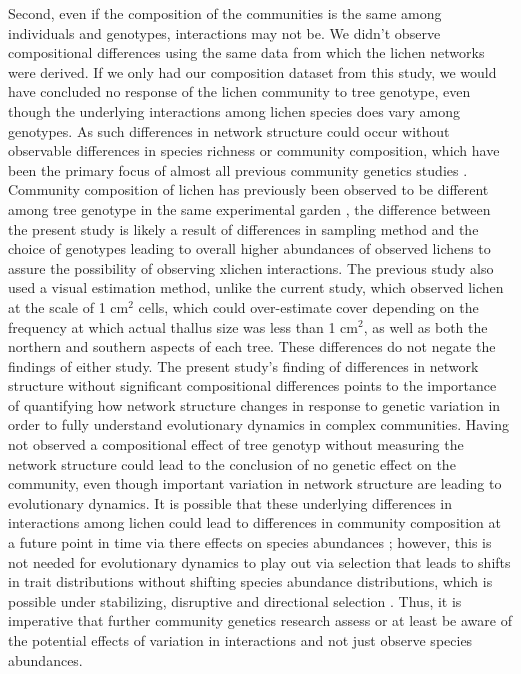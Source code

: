 \documentclass[11pt,twocolumn,twoside,lineno]{pnas-new}
\begin{document}
Second, even if the composition of the communities is the same among
individuals and genotypes, interactions may not be. We didn't observe
compositional differences using the same data from which the lichen
networks were derived. If we only had our composition dataset from
this study, we would have concluded no response of the lichen
community to tree genotype, even though the underlying interactions
among lichen species does vary among genotypes. As such differences in
network structure could occur without observable differences in
species richness or community composition, which have been the primary
focus of almost all previous community genetics studies
\cite{DesRoches2018TheVariation}. Community composition of lichen has
previously been observed to be different among tree genotype in the
same experimental garden \cite{Lamit2011, Lamit2015a}, the difference
between the present study is likely a result of differences in
sampling method and the choice of genotypes leading to overall higher
abundances of observed lichens to assure the possibility of observing
xlichen interactions. The previous study also used a visual estimation
method, unlike the current study, which observed lichen at the scale
of 1 cm$^2$ cells, which could over-estimate cover depending on the
frequency at which actual thallus size was less than 1 cm$^2$, as well
as both the northern and southern aspects of each tree. These
differences do not negate the findings of either study. The present
study's finding of differences in network structure without
significant compositional differences points to the importance of
quantifying how network structure changes in response to genetic
variation in order to fully understand evolutionary dynamics in
complex communities. Having not observed a compositional effect of
tree genotyp without measuring the network structure could lead to the
conclusion of no genetic effect on the community, even though
important variation in network structure are leading to evolutionary
dynamics. It is possible that these underlying differences in
interactions among lichen could lead to differences in community
composition at a future point in time via there effects on species
abundances \cite{Shuster2006COMMUNITYSTRUCTURE}; however, this is not
needed for evolutionary dynamics to play out via selection that leads
to shifts in trait distributions without shifting species abundance
distributions, which is possible under stabilizing, disruptive and
directional selection \cite{Conner2004ATextbook}. Thus, it is
imperative that further community genetics research assess or at least
be aware of the potential effects of variation in interactions and not
just observe species abundances.
\end{document}
